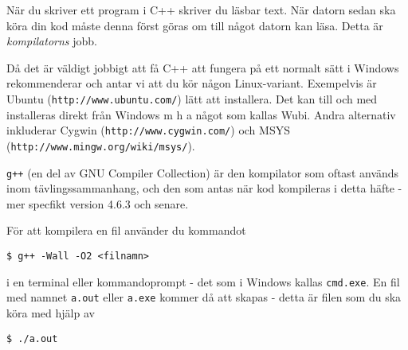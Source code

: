 När du skriver ett program i C++ skriver du läsbar text. När datorn sedan ska köra din kod måste denna först göras om till något datorn kan läsa. Detta är \emph{kompilatorns} jobb.

Då det är väldigt jobbigt att få C++ att fungera på ett normalt sätt i Windows rekommenderar och antar vi att du kör någon Linux-variant. Exempelvis är Ubuntu (\texttt{http://www.ubuntu.com/}) lätt att installera. Det kan till och med installeras direkt från Windows m h a något som kallas Wubi. Andra alternativ inkluderar Cygwin (\texttt{http://www.cygwin.com/}) och MSYS (\texttt{http://www.mingw.org/wiki/msys/}). 

\texttt{g++} (en del av GNU Compiler Collection) är den kompilator som oftast används inom tävlingssammanhang, och den som antas när kod kompileras i detta häfte - mer specfikt version 4.6.3 och senare.

För att kompilera en fil använder du kommandot

\texttt{\$ g++ -Wall -O2 <filnamn>}

i en terminal eller kommandoprompt - det som i Windows kallas \texttt{cmd.exe}. En fil med namnet \texttt{a.out} eller \texttt{a.exe} kommer då att skapas - detta är filen som du ska köra med hjälp av

\texttt{\$ ./a.out}
